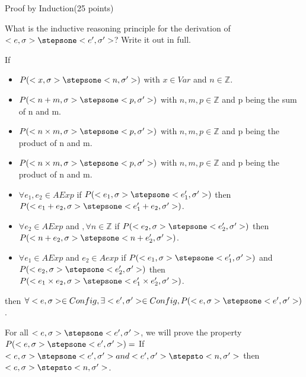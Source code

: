 \documentclass{article}
\begin{document}
%
%
%

\newpage
\begin{question}{Proof by Induction}{(25 points)}


  
  \begin{subquestion}
  	 What is the inductive reasoning principle for the derivation of $<e, \sigma> \stepsone <e', \sigma'>$? Write it out in full.
  	 
  	 If
  	 \begin{itemize}
  	 \item $P(<x, \sigma> \stepsone <n, \sigma'>)$ with $x \in Var$ and $n \in \mathbb{Z}$.
   	 \item $P(<n+m, \sigma> \stepsone <p, \sigma'>)$ with $n,m,p \in \mathbb{Z}$ and p being the sum of n and m.
   	 \item $P(<n \times m, \sigma> \stepsone <p, \sigma'>)$ with $n,m,p \in \mathbb{Z}$ and p being the product of n and m.
   	 \item $P(<n \times m, \sigma> \stepsone <p, \sigma'>)$ with $n,m,p \in \mathbb{Z}$ and p being the product of n and m.
   	 \item $\forall e_1, e_2 \in AExp$ if $P(<e_1, \sigma> \stepsone <e_1', \sigma'>)$ then $P(<e_1+e_2, \sigma> \stepsone <e_1'+e_2, \sigma'>)$.
   	 \item $\forall e_2 \in AExp$ and $, \forall n \in \mathbb{Z}$ if $P(<e_2, \sigma> \stepsone <e_2', \sigma'>)$ then $P(<n+e_2, \sigma> \stepsone <n+e_2', \sigma'>)$.
   	 \item $\forall e_1 \in AExp$ and $e_2 \in Aexp$ if $P(<e_1, \sigma> \stepsone <e_1', \sigma'>)$ and $P(<e_2, \sigma> \stepsone <e_2', \sigma'>)$ then $P(<e_1 \times e_2, \sigma> \stepsone <e_1' \times e_2', \sigma'>)$.
  	 \end{itemize}
   	 then $\forall <e, \sigma> \in Config, \exists <e', \sigma'> \in Config, P(<e, \sigma> \stepsone <e', \sigma'>)$.
  	 
  	
  \end{subquestion}

  \begin{subquestion}
    For all $<e,\sigma> \stepsone <e',\sigma'>$, we will prove the property $P(<e,\sigma> \stepsone <e',\sigma'>) =$ If $<e, \sigma> \stepsone <e',\sigma'> and <e', \sigma'> \stepsto <n, \sigma'>$ then $<e, \sigma> \stepsto <n, \sigma'>$.
  \end{subquestion}


\end{question}
\end{document}
